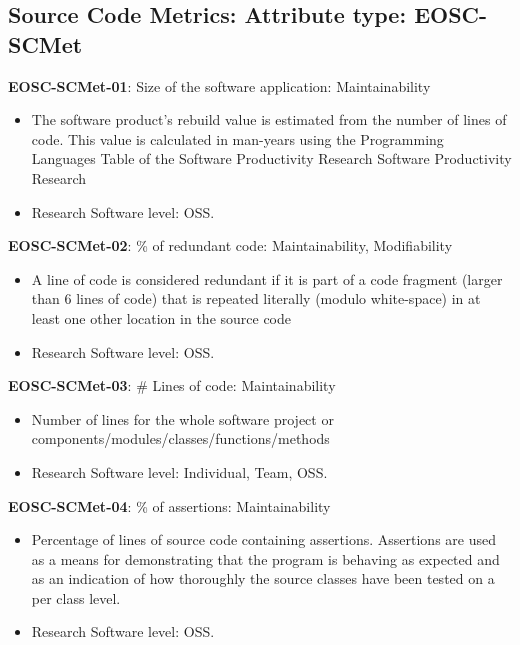 \subsection{Source Code Metrics: Attribute type: EOSC-SCMet}

\textbf{EOSC-SCMet-01}: Size of the software application: Maintainability

\begin{itemize}
    \item The software product's rebuild value is estimated from the number of lines of code. This value is calculated in man-years using the  Programming Languages Table of the Software Productivity Research Software Productivity Research \cite{baggen_standardized_2012}
    \item Research Software level: OSS.
\end{itemize}

\textbf{EOSC-SCMet-02}: \% of redundant code: Maintainability, Modifiability

\begin{itemize}
    \item A line of code is considered redundant if it is part of a code fragment (larger than 6 lines of code) that is repeated literally (modulo  white-space) in at least one other location in the source code \cite{baggen_standardized_2012}
    \item Research Software level: OSS.
\end{itemize}

\textbf{EOSC-SCMet-03}: \# Lines of code: Maintainability

\begin{itemize}
    \item Number of lines for the whole software project or components/modules/classes/functions/methods \cite{montagud_systematic_2012,baggen_standardized_2012}
    \item Research Software level: Individual, Team, OSS.
\end{itemize}

\textbf{EOSC-SCMet-04}: \% of assertions: Maintainability

\begin{itemize}
    \item Percentage of lines of source code containing assertions. Assertions are used as a means for demonstrating that the program is behaving as expected and as an indication of how thoroughly the source classes have been tested on a per class level. \cite{nagappan_early_2005}
    \item Research Software level: OSS.
\end{itemize}

